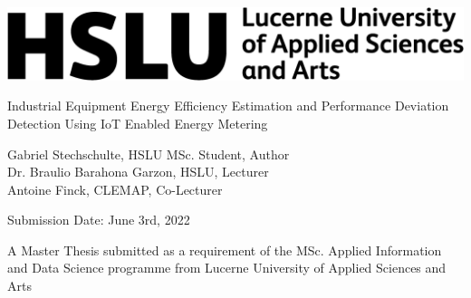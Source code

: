\begin{titlepage}
    \begin{center}
        \includegraphics[]{images/hslu_logo.png}
        \vfill
        
        \huge{Industrial Equipment Energy Efficiency Estimation and Performance Deviation Detection Using IoT Enabled Energy Metering}
        
        \vfill
        
        \large{Gabriel Stechschulte, HSLU MSc. Student, Author} \\[10pt]
        \large{Dr. Braulio Barahona Garzon, HSLU, Lecturer} \\[10pt]
        \large{Antoine Finck, CLEMAP, Co-Lecturer}
        
        \vfill
        
        \large{Submission Date: June 3rd, 2022} 
        
        \vfill
        
        A Master Thesis submitted as a requirement of the MSc. Applied Information and Data Science programme from Lucerne University of Applied Sciences and Arts
    \end{center}
\end{titlepage}